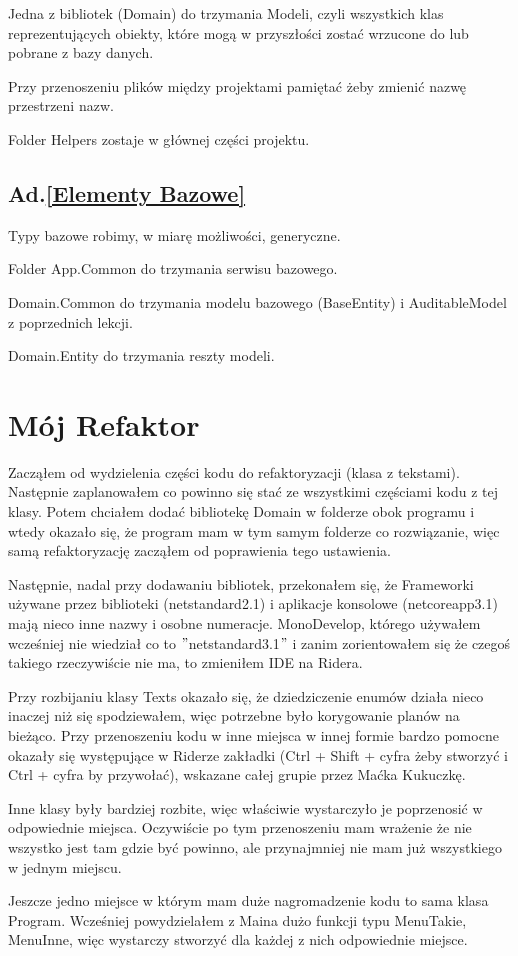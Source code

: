 \documentclass[10pt]{article}
\begin{document}
Jedna z bibliotek (Domain) do trzymania Modeli, czyli wszystkich klas reprezentujących obiekty, które mogą w przyszłości zostać wrzucone do lub pobrane z bazy danych.

Przy przenoszeniu plików między projektami pamiętać żeby zmienić nazwę przestrzeni nazw.

Folder Helpers zostaje w głównej części projektu.

\subsection{Ad.\ref{Elementy Bazowe}}
Typy bazowe robimy, w miarę możliwości, generyczne.

Folder App.Common do trzymania serwisu bazowego.

Domain.Common do trzymania modelu bazowego (BaseEntity) i AuditableModel z poprzednich lekcji.

Domain.Entity do trzymania reszty modeli.

\section{Mój Refaktor}
Zacząłem od wydzielenia części kodu do refaktoryzacji (klasa z tekstami). Następnie zaplanowałem co powinno się stać ze wszystkimi częściami kodu z tej klasy. Potem chciałem dodać bibliotekę Domain w folderze obok programu i wtedy okazało się, że program mam w tym samym folderze co rozwiązanie, więc samą refaktoryzację zacząłem od poprawienia tego ustawienia.

Następnie, nadal przy dodawaniu bibliotek, przekonałem się, że Frameworki używane przez biblioteki (netstandard2.1) i aplikacje konsolowe (netcoreapp3.1) mają nieco inne nazwy i osobne numeracje. MonoDevelop, którego używałem wcześniej nie wiedział co to $"$netstandard3.1$"$ i zanim zorientowałem się że czegoś takiego rzeczywiście nie ma, to zmieniłem IDE na Ridera.

Przy rozbijaniu klasy Texts okazało się, że dziedziczenie enumów działa nieco inaczej niż się spodziewałem, więc potrzebne było korygowanie planów na bieżąco. Przy przenoszeniu kodu w inne miejsca w innej formie bardzo pomocne okazały się występujące w Riderze zakładki (Ctrl + Shift + cyfra żeby stworzyć i Ctrl + cyfra by przywołać), wskazane całej grupie przez Maćka Kukuczkę.

Inne klasy były bardziej rozbite, więc właściwie wystarczyło je poprzenosić w odpowiednie miejsca. Oczywiście po tym przenoszeniu mam wrażenie że nie wszystko jest tam gdzie być powinno, ale przynajmniej nie mam już wszystkiego w jednym miejscu.

Jeszcze jedno miejsce w którym mam duże nagromadzenie kodu to sama klasa Program. Wcześniej powydzielałem z Maina dużo funkcji typu MenuTakie, MenuInne, więc wystarczy stworzyć dla każdej z nich odpowiednie miejsce.
\end{document}
